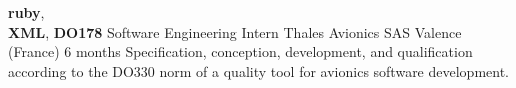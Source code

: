 \documentclass[11pt,a4paper]{moderncv}
\begin{document}
  \cventry
    {\textbf{ruby}, \\ \textbf{XML}, \textbf{DO178}}
    {Software Engineering Intern}
    {Thales Avionics SAS}
    {Valence (France)}
    {6 months}{
      Specification, conception,  development, and qualification according to
      the DO330 norm of a quality tool for avionics software development.
    }







\end{document}
